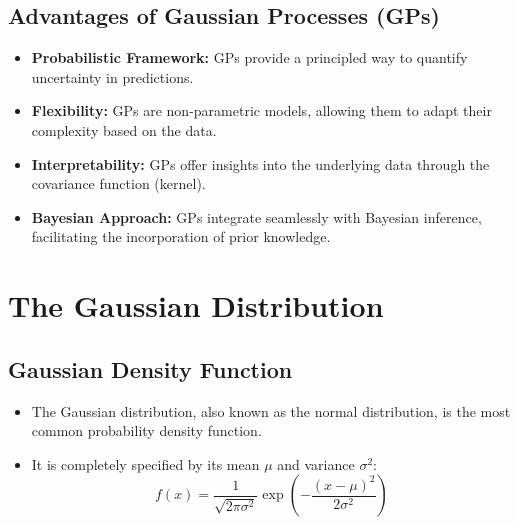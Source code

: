 \documentclass[12pt]{article}
\begin{document}
\subsection{Advantages of Gaussian Processes (GPs)}
\begin{itemize}
    \item \textbf{Probabilistic Framework:} GPs provide a principled way to quantify uncertainty in predictions.
    \item \textbf{Flexibility:} GPs are non-parametric models, allowing them to adapt their complexity based on the data.
    \item \textbf{Interpretability:} GPs offer insights into the underlying data through the covariance function (kernel).
    \item \textbf{Bayesian Approach:} GPs integrate seamlessly with Bayesian inference, facilitating the incorporation of prior knowledge.
\end{itemize}

\section{The Gaussian Distribution}

\subsection{Gaussian Density Function}
\begin{itemize}
    \item The Gaussian distribution, also known as the normal distribution, is the most common probability density function.
    \item It is completely specified by its mean \( \mu \) and variance \( \sigma^2 \):
    \[
    f(x) = \frac{1}{\sqrt{2\pi \sigma^2}} \exp\left( -\frac{(x - \mu)^2}{2\sigma^2} \right)
    \]
\end{itemize}
\end{document}
